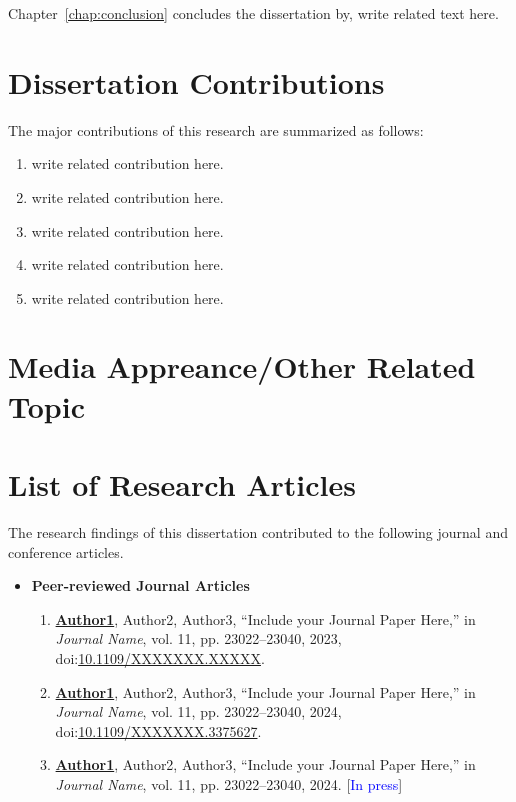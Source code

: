 Chapter~\ref{chap:conclusion} concludes the dissertation by, write related text here.

\section{Dissertation Contributions} \label{sec:contributions}

The major contributions of this research are summarized as follows:

\begin{enumerate}
	\item{write related contribution here. }
	\item{write related contribution here.}
	\item{write related contribution here.}
	\item{write related contribution here.}
	\item{write related contribution here.} 
\end{enumerate} 


\section{Media Appreance\slash Other Related Topic} \label{sec:media}

 \lipsum[1-2]


\section{List of Research Articles} \label{sec:publications}

The research findings of this dissertation contributed to the following journal and conference articles. 

\begin{itemize}
	\item \textbf{Peer-reviewed Journal Articles}
	\renewcommand{\theenumi}{J\arabic{enumi}}
	\begin{enumerate}
		\small
		\setcounter{enumi}{0}
		\item{\textbf{\underline{Author1}}, Author2, Author3,  “Include your Journal Paper Here,” in \textit{Journal Name}, vol. 11, pp. 23022–23040, 2023, doi:\href{https://ieeexplore.ieee.org/document/10160006}{10.1109/XXXXXXX.XXXXX}.}
		\vspace{2.0mm}
		\item{\textbf{\underline{Author1}}, Author2, Author3,  “Include your Journal Paper Here,” in \textit{Journal Name}, vol. 11, pp. 23022–23040, 2024, doi:\href{https://ieeexplore.ieee.org/document/10465248}{10.1109/XXXXXXX.3375627}.}
		\vspace{2.0mm} 
		\item{\textbf{\underline{Author1}}, Author2, Author3,  “Include your Journal Paper Here,” in \textit{Journal Name}, vol. 11, pp. 23022–23040, 2024. [\textcolor{blue}{In press}]}
	\end{enumerate}  
\end{itemize}

